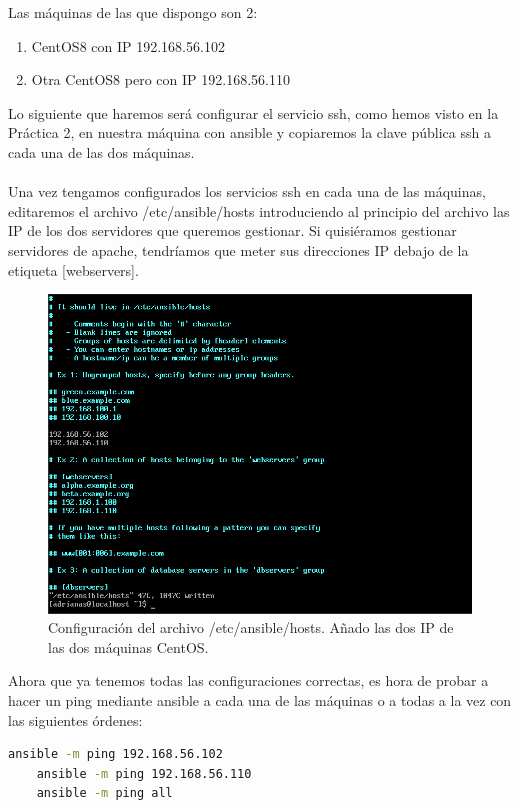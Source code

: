 Las máquinas de las que dispongo son 2:

\begin{enumerate}
	\item CentOS8 con IP 192.168.56.102
	\item Otra CentOS8 pero con IP 192.168.56.110
\end{enumerate}

Lo siguiente que haremos será configurar el servicio ssh, como hemos visto en la Práctica 2, en nuestra máquina con ansible y copiaremos la clave pública ssh a cada una de las dos máquinas.
\\\\
Una vez tengamos configurados los servicios ssh en cada una de las máquinas, editaremos el archivo /etc/ansible/hosts introduciendo al principio del archivo las IP de los dos servidores que queremos gestionar. Si quisiéramos gestionar servidores de apache, tendríamos que meter sus direcciones IP debajo de la etiqueta [webservers].

\begin{figure}[H]
	\centering
	\includegraphics[scale=0.4]{graphics/img16}
	\caption{Configuración del archivo /etc/ansible/hosts. Añado las dos IP de las dos máquinas CentOS.}
\end{figure}

\newpage
Ahora que ya tenemos todas las configuraciones correctas, es hora de probar a hacer un ping mediante ansible a cada una de las máquinas o a todas a la vez con las siguientes órdenes:

\begin{lstlisting}[language=bash]
	ansible -m ping 192.168.56.102
	ansible -m ping 192.168.56.110
	ansible -m ping all
\end{lstlisting}


